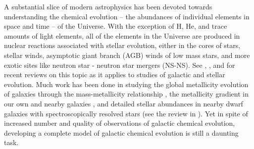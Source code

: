 A substantial slice of modern astrophysics has been devoted towards understanding the chemical evolution -- the abundances of individual elements in space and time -- of the Universe. With the exception of H, He, and trace amounts of light elements, all of the elements in the Universe are produced in nuclear reactions associated with stellar evolution, either in the cores of stars, stellar winds, asymptotic giant branch (AGB) winds of low mass stars, and more exotic sites like neutron star - neutron star mergers (NS-NS). See \cite{Nomoto2013}, \cite{Thielmann2017}, and \cite{Frebel2018} for recent reviews on this topic as it applies to studies of galactic and stellar evolution. Much work has been done in studying the global metallicity evolution of galaxies through the mass-metallicity relationship \citep[e.g.][]{Lequeux1979,Tremonti2004,Lee2006,Zahid2012,AndrewsMartini2013}, the metallicity gradient in our own and nearby galaxies \citep[e.g.][]{Searle1971,Shaver1983,Belfiore2017,SanchezMenguiano2017}, and detailed stellar abundances in nearby dwarf galaxies with spectroscopically resolved stars (see the review in \cite{Tolstoy2009}). Yet in spite of increased number and quality of observations of galactic chemical evolution, developing a complete model of galactic chemical evolution is still a daunting task.

